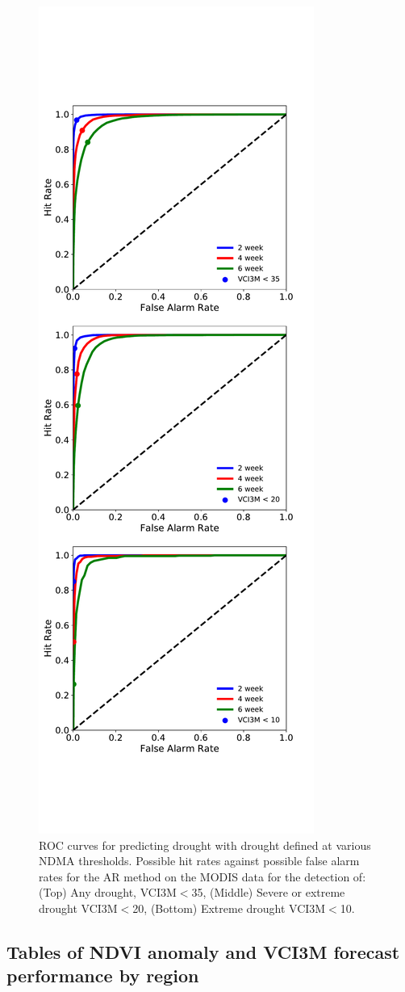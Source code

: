 \documentclass[review]{elsarticle}
\begin{document}
\begin{figure}[H]
	\centering
\includegraphics[trim = 30mm 35mm 0mm 10mm,width=5.4cm cm]{figures/VCIotherROCabb.pdf} 
	\caption{ROC curves for predicting drought with drought defined at various NDMA thresholds. Possible hit rates against possible false alarm rates for the AR method on the MODIS data for the detection of: (Top) Any drought, VCI3M$<$35, (Middle) Severe or extreme drought VCI3M$<$20, (Bottom) Extreme drought VCI3M$<$10.} \label{fig:ROCotherdrought}
\end{figure}

\newpage
\subsection{Tables of NDVI anomaly and VCI3M forecast performance by region} \label{app}
\end{document}
